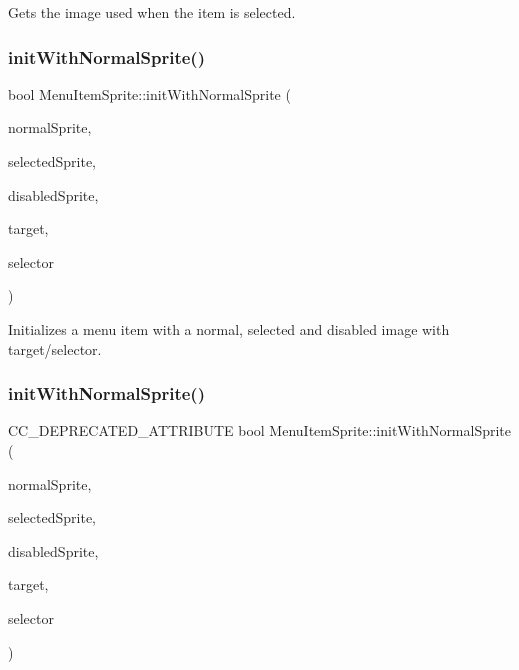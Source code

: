 Gets the image used when the item is selected. \mbox{\label{classMenuItemSprite_ae69d347fb65cc123efd80161767280ec}} 
\subsubsection{\texorpdfstring{init\+With\+Normal\+Sprite()}{initWithNormalSprite()}\hspace{0.1cm}{\footnotesize\ttfamily [1/4]}}
{\footnotesize\ttfamily bool Menu\+Item\+Sprite\+::init\+With\+Normal\+Sprite (\begin{DoxyParamCaption}\item[{\hyperlink{classNode}{Node} $\ast$}]{normal\+Sprite,  }\item[{\hyperlink{classNode}{Node} $\ast$}]{selected\+Sprite,  }\item[{\hyperlink{classNode}{Node} $\ast$}]{disabled\+Sprite,  }\item[{\hyperlink{classRef}{Ref} $\ast$}]{target,  }\item[{S\+E\+L\+\_\+\+Menu\+Handler}]{selector }\end{DoxyParamCaption})}

Initializes a menu item with a normal, selected and disabled image with target/selector. \mbox{\label{classMenuItemSprite_a6f749eaf6a4bb0d69bdb2f1b63e010e5}} 
\subsubsection{\texorpdfstring{init\+With\+Normal\+Sprite()}{initWithNormalSprite()}\hspace{0.1cm}{\footnotesize\ttfamily [2/4]}}
{\footnotesize\ttfamily C\+C\+\_\+\+D\+E\+P\+R\+E\+C\+A\+T\+E\+D\+\_\+\+A\+T\+T\+R\+I\+B\+U\+TE bool Menu\+Item\+Sprite\+::init\+With\+Normal\+Sprite (\begin{DoxyParamCaption}\item[{\hyperlink{classNode}{Node} $\ast$}]{normal\+Sprite,  }\item[{\hyperlink{classNode}{Node} $\ast$}]{selected\+Sprite,  }\item[{\hyperlink{classNode}{Node} $\ast$}]{disabled\+Sprite,  }\item[{\hyperlink{classRef}{Ref} $\ast$}]{target,  }\item[{S\+E\+L\+\_\+\+Menu\+Handler}]{selector }\end{DoxyParamCaption})}

